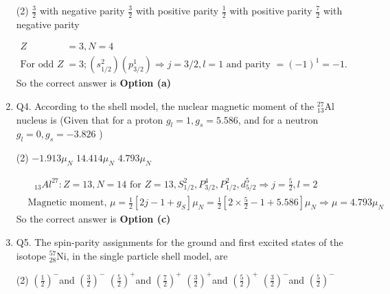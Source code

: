 \begin{enumerate}
	{}
	\begin{tasks}(2)
		\task[\textbf{a.}]$\frac{3}{2}$ with negative parity
		\task[\textbf{b.}]$\frac{3}{2}$ with positive parity
		\task[\textbf{c.}]$\frac{1}{2}$ with positive parity
		\task[\textbf{d.}] $\frac{7}{2}$ with negative parity
	\end{tasks}
	\begin{answer}
		\begin{align*}
		Z&=3, N=4\\
		\text{For odd }Z&=3 ;\left(s_{1 / 2}^2\right)\left(p_{3 / 2}^1\right) \Rightarrow j=3 / 2, l=1\text{ and parity $=(-1)^1=-1$.}
		\end{align*}
		So the correct answer is \textbf{Option (a)}
	\end{answer}
	\item Q4. According to the shell model, the nuclear magnetic moment of the ${ }_{13}^{27} \mathrm{Al}$ nucleus is (Given that for a proton $g_l=1, g_s=5.586$, and for a neutron $g_l=0, g_s=-3.826$ )
	{}
	\begin{tasks}(2)
		\task[\textbf{a.}] $-1.913 \mu_N$
		\task[\textbf{b.}] $14.414 \mu_N$
		\task[\textbf{c.}]$4.793 \mu_N$
	\end{tasks}
	\begin{answer}
		\begin{align*}
		&\text{ ${ }_{13} A l^{27}: Z=13, N=14$ for $Z=13, S_{1 / 2}^2, P_{3 / 2}^4, P_{1 / 2}^2, d_{5 / 2}^5 \Rightarrow j=\frac{5}{2}, l=2$}\\
		&\text{Magnetic moment, $\mu=\frac{1}{2}\left[2 j-1+g_S\right] \mu_N=\frac{1}{2}\left[2 \times \frac{5}{2}-1+5.586\right] \mu_N \Rightarrow \mu=4.793 \mu_N$}
		\end{align*}
		So the correct answer is \textbf{Option (c)}
	\end{answer}
	\item Q5. The spin-parity assignments for the ground and first excited states of the isotope ${ }_{28}^{57} \mathrm{Ni}$, in the single particle shell model, are
	{}
	\begin{tasks}(2)
		\task[\textbf{a.}]$\left(\frac{1}{2}\right)^{-}$and $\left(\frac{3}{2}\right)^{-}$
		\task[\textbf{b.}] $\left(\frac{5}{2}\right)^{+}$and $\left(\frac{7}{2}\right)^{+}$
		\task[\textbf{c.}]$\left(\frac{3}{2}\right)^{+}$and $\left(\frac{5}{2}\right)^{+}$
		\task[\textbf{d.}] $\left(\frac{3}{2}\right)^{-}$and $\left(\frac{5}{2}\right)^{-}$
	\end{tasks}

\end{enumerate}
